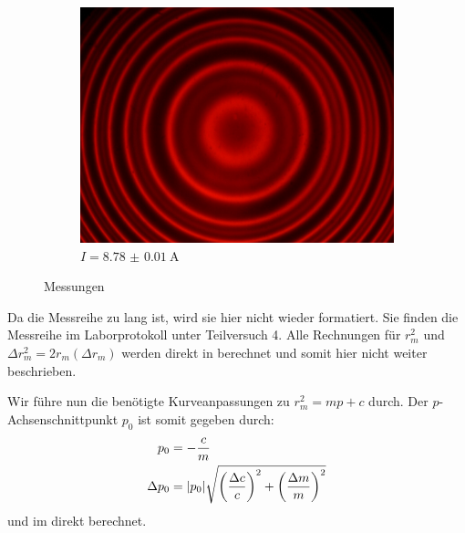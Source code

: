 \begin{figure}[!ht]
\begin{subfigure}{0.48\textwidth}
			\centering
			\includegraphics[width=\textwidth]{images/Capture_821.bmp.jpg}
			\caption{$I = \SI{8.78(1)}{\ampere}$}
			\label{fig:red_I8.78}
		\end{subfigure}
	    \caption{Messungen}
	    \label{fig:tv4-messungen}
	\end{figure}
	\newpage
	Da die Messreihe zu lang ist, wird sie hier nicht wieder formatiert. Sie finden die Messreihe im Laborprotokoll unter Teilversuch 4. Alle Rechnungen für $r_m^2$ und $\Delta r_m^2 = 2r_m(\Delta r_m)$ werden direkt in \gnuplot{} berechnet und somit hier nicht weiter beschrieben. 

	Wir führe nun die benötigte Kurveanpassungen zu $r_m^2 = mp + c$ durch. Der $p$-Achsenschnittpunkt $p_0$ ist somit gegeben durch:
	\begin{align}
		p_0 &= -\frac{c}{m} \\
		\Delta p_0 &= |p_0|\relquad{c,m}
	\end{align}
	und im \gnuplot{} direkt berechnet. 

